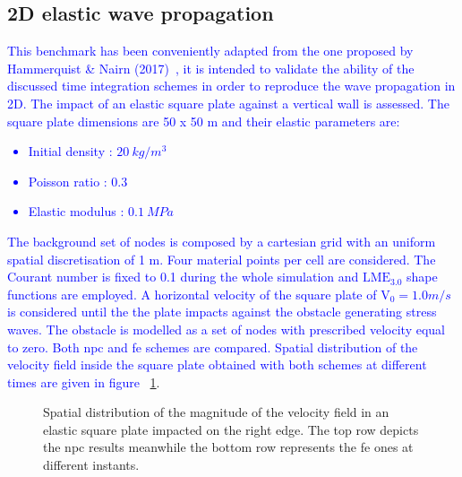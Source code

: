 \documentclass[preprint,12pt,a4paper]{elsarticle}
\begin{document}
\subsection{2D elastic wave propagation}
\label{sec:Velocity-waves-elastic-domain}

\textcolor{blue}{This benchmark has been conveniently adapted from the one proposed by  Hammerquist \& Nairn (2017)~\cite{HAMMERQUIST2017724}, it is intended to validate the ability of the discussed time integration schemes in order to reproduce the wave propagation in 2D. The impact of an elastic square plate against a vertical wall is assessed. The square plate dimensions are 50 x 50 m and their elastic parameters are:
\begin{itemize} 
\item  Initial density : $20\ kg/m^3$
\item  Poisson ratio : $0.3$
\item  Elastic modulus : $0.1\ MPa$
\end{itemize}
}
\textcolor{blue}{The background set of nodes is composed by a cartesian grid with an uniform spatial discretisation of 1 m. Four material points per cell are considered. The Courant number is fixed to 0.1 during the whole simulation and $\text{LME}_{3.0}$ shape functions are employed. A horizontal velocity of the square plate of $\text{V}_0 = 1.0 m/s$ is considered until the the plate impacts against the obstacle generating stress waves. The obstacle is modelled as a set of nodes with prescribed velocity equal to zero. Both \acrshort{npc} and \acrshort{fe} schemes are compared. Spatial distribution of the velocity field inside the square plate obtained with both schemes at different times are given in figure ~\ref{fig:Magnitude_velocity_impact_square}}. 
\begin{figure}
  \centering
  \caption{Spatial distribution of the magnitude of the velocity field in an elastic square plate impacted on the right edge. The top row depicts the \acrshort{npc} results meanwhile the bottom row represents the \acrshort{fe} ones at different instants.}
  \label{fig:Magnitude_velocity_impact_square}
\end{figure}
\end{document}

